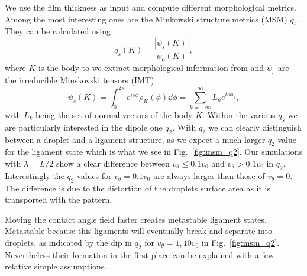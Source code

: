 \documentclass[twocolumn,amsmath,amssymb,showpacs,pre,nofootinbib,superscriptaddress]{revtex4-1} %
\begin{document}
We use the film thickness as input and compute different morphological metrics.
Among the most interesting ones are the Minkowski structure metrics (MSM) $q_s$.
They can be calculated using~\cite{doi:10.1063/1.4774084}
\begin{equation}
    q_s(K) = \frac{|\psi_s(K)|}{\psi_0(K)}, 
\end{equation}
where $K$ is the body to we extract morphological information from and $\psi_s$ are the irreducible Minskovski tensors (IMT)
\begin{equation}
    \psi_s(K) = \int_{0}^{2\pi}e^{is\phi}\rho_K(\phi) \dd\phi = \sum_{k=-\infty}^{\infty} L_k e^{is\phi_k},
\end{equation}
with $L_k$ being the set of normal vectors of the body $K$.
Within the various $q_s$ we are particularly interested in the dipole one $q_2$. 
With $q_2$ we can clearly distinguish between a droplet and a ligament structure, as we expect a much larger $q_2$ value for the ligament state which is what we see in Fig.~\ref{fig:msm_q2}.
Our simulations with $\lambda = L/2$ show a clear difference between $v_{\theta} \leq 0.1v_0$ and $v_{\theta}>0.1v_0$  in $q_2$.
Interestingly the $q_2$ values for $v_{\theta} = 0.1v_0$ are always larger than those of $v_{\theta} = 0$.
The difference is due to the distortion of the droplets surface area as it is transported with the pattern.

Moving the contact angle field faster creates metastable ligament states.
Metastable because this ligaments will eventually break and separate into droplets, as indicated by the dip in $q_2$ for $v_{\theta} = 1, 10 v_0$ in Fig.~\ref{fig:msm_q2}.
Nevertheless their formation in the first place can be explained with a few relative simple assumptions.
\end{document}
